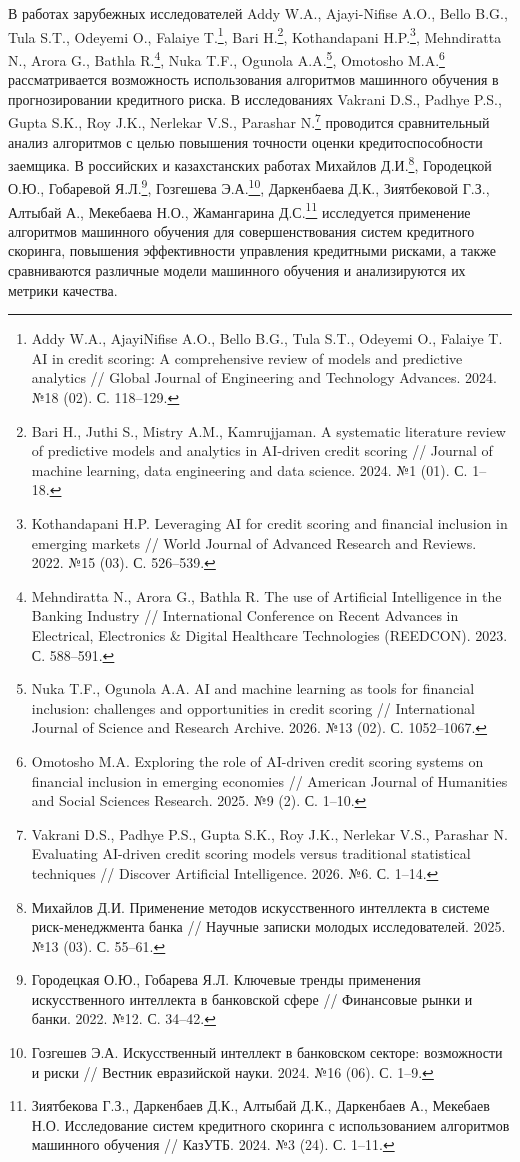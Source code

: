 	В работах зарубежных исследователей Addy W.A., Ajayi-Nifise A.O., Bello B.G., Tula S.T., Odeyemi O., Falaiye T.\footnote{Addy W.A., AjayiNifise A.O., Bello B.G., Tula S.T., Odeyemi O., Falaiye T. AI in credit scoring: A comprehensive review of models and predictive analytics // Global Journal of Engineering and Technology Advances. 2024. №18 (02). С. 118--129.}, Bari H.\footnote{Bari H., Juthi S., Mistry A.M., Kamrujjaman. A systematic literature review of predictive models and analytics in AI-driven credit scoring // Journal of machine learning, data engineering and data science. 2024. №1 (01). С. 1--18.}, Kothandapani H.P.\footnote{Kothandapani H.P. Leveraging AI for credit scoring and financial inclusion in emerging markets // World Journal of Advanced Research and Reviews. 2022. №15 (03). С. 526--539.}, Mehndiratta N., Arora G., Bathla R.\footnote{Mehndiratta N., Arora G., Bathla R. The use of Artificial Intelligence in the Banking Industry // International Conference on Recent Advances in Electrical, Electronics \& Digital Healthcare Technologies (REEDCON). 2023. С. 588--591.}, Nuka T.F., Ogunola A.A.\footnote{Nuka T.F., Ogunola A.A. AI and machine learning as tools for financial inclusion: challenges and opportunities in credit scoring // International Journal of Science and Research Archive. 2026. №13 (02). С. 1052--1067.}, Omotosho M.A.\footnote{Omotosho M.A. Exploring the role of AI-driven credit scoring systems on financial inclusion in emerging economies // American Journal of Humanities and Social Sciences Research. 2025. №9 (2). С. 1--10.} рассматривается возможность использования алгоритмов машинного обучения в прогнозировании кредитного риска. В исследованиях Vakrani D.S., Padhye P.S., Gupta S.K., Roy J.K., Nerlekar V.S., Parashar N.\footnote{Vakrani D.S., Padhye P.S., Gupta S.K., Roy J.K., Nerlekar V.S., Parashar N. Evaluating AI-driven credit scoring models versus traditional statistical techniques // Discover Artificial Intelligence. 2026. №6. С. 1--14.} проводится сравнительный анализ алгоритмов с целью повышения точности оценки кредитоспособности заемщика. В российских и казахстанских работах Михайлов Д.И.\footnote{Михайлов Д.И. Применение методов искусственного интеллекта в системе риск-менеджмента банка // Научные записки молодых исследователей. 2025. №13 (03). С. 55--61.}, Городецкой О.Ю., Гобаревой Я.Л.\footnote{Городецкая О.Ю., Гобарева Я.Л. Ключевые тренды применения искусственного интеллекта в банковской сфере // Финансовые рынки и банки. 2022. №12. С. 34--42.}, Гозгешева Э.А.\footnote{Гозгешев Э.А. Искусственный интеллект в банковском секторе: возможности и риски // Вестник евразийской науки. 2024. №16 (06). С. 1--9.}, Даркенбаева Д.К., Зиятбековой Г.З., Алтыбай А., Мекебаева Н.О., Жамангарина Д.С.\footnote{Зиятбекова Г.З., Даркенбаев Д.К., Алтыбай Д.К., Даркенбаев А., Мекебаев Н.О. Исследование систем кредитного скоринга с использованием алгоритмов машинного обучения // КазУТБ. 2024. №3 (24). С. 1--11.} исследуется применение алгоритмов машинного обучения для совершенствования систем кредитного скоринга, повышения эффективности управления кредитными рисками, а также сравниваются различные модели машинного обучения и анализируются их метрики качества.
	
